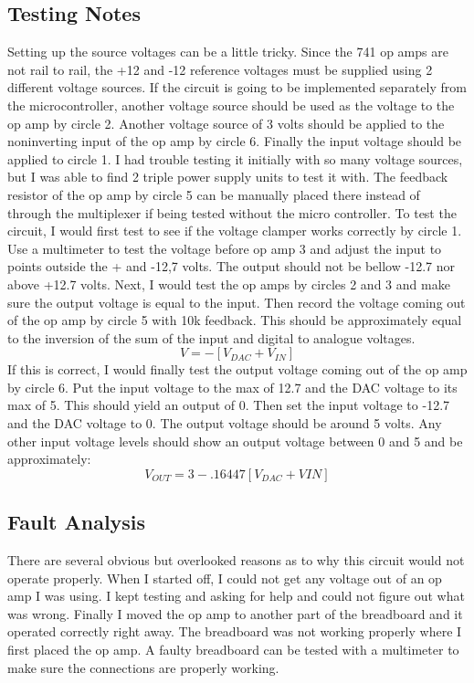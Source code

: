 \subsection{Testing Notes}
Setting up the source voltages can be a little tricky. Since the 741 op amps 
are not rail to rail, the +12 and -12 reference voltages must be supplied using
 2 different voltage sources. If the circuit is going to be implemented 
separately from the microcontroller, another voltage source should be used as
 the voltage to the op amp by circle 2. Another voltage source of 3 volts
 should be applied to the noninverting input of the op amp by circle 6. 
Finally the input voltage should be applied to circle 1. I had trouble testing
 it initially with so many voltage sources, but I was able to find 2 triple
 power supply units to test it with. The feedback resistor of the op amp by 
circle 5 can be manually placed there instead of through the multiplexer if
 being tested without the micro controller. To test the circuit, I would first 
test to see if the voltage clamper works correctly by circle 1. Use a 
multimeter to test the voltage before op amp 3 and adjust the input to points 
outside the + and -12,7 volts. The output should not be bellow -12.7 nor
 above +12.7 volts. Next, I would test the op amps by circles 2 and 3 and make 
sure the output voltage is equal to the input. Then record the voltage coming 
out of the op amp by circle 5 with 10k feedback. This should be approximately 
equal to the inversion of the sum of the input and digital to analogue
 voltages.
\begin{equation}V = - [V_{DAC} + V_{IN}]\end{equation}
If this is correct, I would finally test the output voltage coming out of the op amp by circle 6. Put the input voltage to the max of 12.7 and the DAC voltage to its max of 5. This should yield an output of 0. Then set the input voltage to -12.7 and the DAC voltage to 0. The output voltage should be around 5 volts. Any other input voltage levels should show an output voltage between 0 and 5 and be approximately:
\begin{equation}V_{OUT} = 3 - .16447[V_{DAC} + V{IN}]\end{equation}

\subsection{Fault Analysis}
There are several obvious but overlooked reasons as to why this circuit would 
not operate properly. When I started off, I could not get any voltage out of 
an op amp I was using. I kept testing and asking for help and could not figure 
out what was wrong. Finally I moved the op amp to another part of the 
breadboard and it operated correctly right away. The breadboard was not
 working properly where I first placed the op amp. A faulty breadboard can be 
tested with a multimeter to make sure the connections are properly working.

